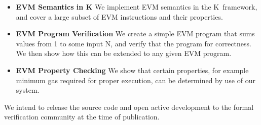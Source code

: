 \begin{itemize}
\item{\bf EVM Semantics in K} We implement EVM semantics in the K~framework, and
cover a large subset of EVM instructions and their properties.
\item{\bf EVM Program Verification} We create a simple EVM program that sums
values from 1 to some input N, and verify that the program for correctness. We then show how this can be extended to any given EVM program.
\item{\bf EVM Property Checking} We show that certain properties, for example
minimum gas required for proper execution, can be determined by use of our system.
\end{itemize}

We intend to release the source code and open active development to the formal
verification community at the time of publication.
